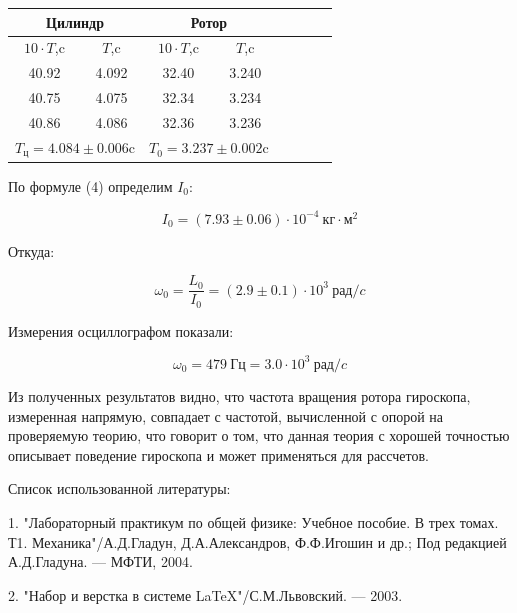 \documentclass[14pt]{article}
\begin{document}
\vspace{0.5cm}
\begin{center}
\begin{tabular}{|c|c|c|c|c|c|c|c|}
\hline
\multicolumn{2}{|c}{Цилиндр}		&	\multicolumn{2}{|c|}{Ротор}												\\
\hline
$10\cdot T$,c	&	$T$,c			&	$10\cdot T$,c	&	$T$,c												\\
\hline
40.92			&	4.092			&	32.40			&	3.240												\\
\hline
40.75			&	4.075			&	32.34			&	3.234												\\
\hline
40.86			&	4.086			&	32.36			&	3.236												\\
\hline
\multicolumn{2}{|c}{$T_\text{ц} = 4.084 \pm 0.006$c}	&	\multicolumn{2}{|c|}{$T_0 = 3.237 \pm 0.002$c}		\\
\hline
\end{tabular}
\end{center}

\vspace{0.5cm}
По формуле (4) определим $I_0$:

$$\boxed{I_0 = (7.93 \pm 0.06)\cdot 10^{-4}~\text{кг}\cdot\text{м}^2}$$

Откуда:

$$\omega_0 = \frac{L_0}{I_0} = (2.9 \pm 0.1)\cdot 10^{3}~\text{рад}/c$$

Измерения осциллографом показали:

$$\omega_0 = 479~\text{Гц} = 3.0 \cdot 10^{3}~\text{рад}/c$$

\vspace{1cm}

Из полученных результатов видно, что частота вращения ротора гироскопа, измеренная напрямую, совпадает с частотой, вычисленной с опорой на проверяемую теорию, что говорит о том, что данная теория с хорошей точностью описывает поведение гироскопа и может применяться для рассчетов.

\newpage
Список использованной литературы:
	
\vspace{0.5cm}
1. "Лабораторный практикум по общей физике: Учебное пособие. В трех томах. Т1. Механика"/А.Д.Гладун, Д.А.Александров,
Ф.Ф.Игошин и др.; Под редакцией А.Д.Гладуна. --- МФТИ, 2004.

2. "Набор и верстка в системе \LaTeX "/С.М.Львовский. --- 2003.
\end{document}
